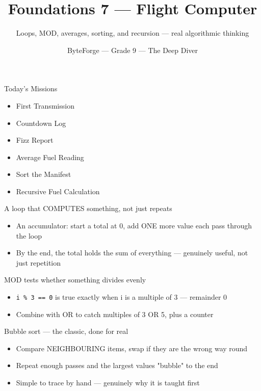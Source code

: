 \documentclass[aspectratio=169]{beamer}
\title{Foundations 7 — Flight Computer}
\subtitle{Loops, MOD, averages, sorting, and recursion --- real algorithmic thinking}
\author{ByteForge --- Grade 9 --- The Deep Diver}
\date{}
\begin{document}
\begin{frame}
    \titlepage
\end{frame}

\begin{frame}{Today's Missions}
    \Large
    \begin{itemize}
        \item First Transmission
        \item Countdown Log
        \item Fizz Report
        \item Average Fuel Reading
        \item Sort the Manifest
        \item Recursive Fuel Calculation
    \end{itemize}
\end{frame}

\begin{frame}{A loop that COMPUTES something, not just repeats}
    \large
    \begin{itemize}
        \item An accumulator: start a total at 0, add ONE more value each pass through the loop
        \item By the end, the total holds the sum of everything --- genuinely useful, not just repetition
    \end{itemize}
\end{frame}


\begin{frame}{MOD tests whether something divides evenly}
    \large
    \begin{itemize}
        \item \texttt{i \% 3 == 0} is true exactly when i is a multiple of 3 --- remainder 0
        \item Combine with OR to catch multiples of 3 OR 5, plus a counter
    \end{itemize}
\end{frame}


\begin{frame}{Bubble sort --- the classic, done for real}
    \large
    \begin{itemize}
        \item Compare NEIGHBOURING items, swap if they are the wrong way round
        \item Repeat enough passes and the largest values "bubble" to the end
        \item Simple to trace by hand --- genuinely why it is taught first
    \end{itemize}
\end{frame}
\end{document}
